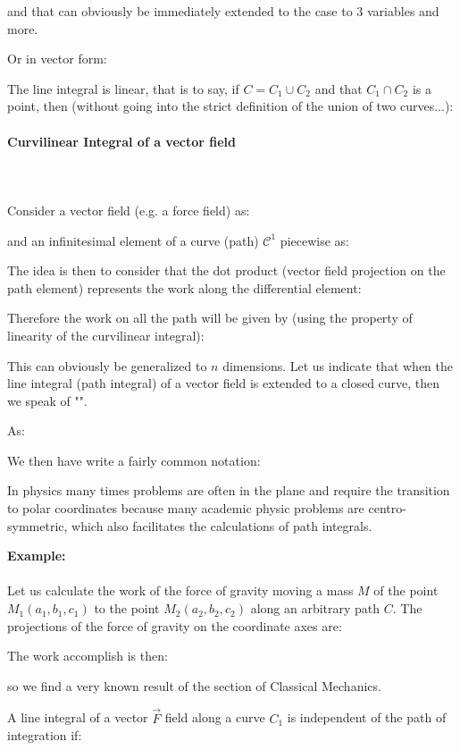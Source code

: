 	and that can obviously be immediately extended to the case to 3 variables and more.
	
	Or in vector form:
	
	The line integral is linear, that is to say, if $C=C_1 \cup C_2$ and that $C_1 \cap C_2$ is a point, then (without going into the strict definition of the union of two curves...):
	
	
	\paragraph{Curvilinear Integral of a vector field}\mbox{}\\\\
	Consider a vector field (e.g. a force field) as:
	
	and an infinitesimal element of a curve (path) $\mathcal{C}^1$ piecewise as:
	
	The idea is then to consider that the dot product (vector field projection on the path element) represents the work along the differential element:
	
	Therefore the work on all the path will be given by (using the property of linearity of the curvilinear integral):
	
	This can obviously be generalized to $n$ dimensions. Let us indicate that when the line integral (path integral) of a vector field is extended to a closed curve, then we speak of "".
	
	As:
	
	We then have write a fairly common notation:
	
	\begin{tcolorbox}[title=Remark,colframe=black,arc=10pt]
	In physics many times problems are often in the plane and require the transition to polar coordinates because many academic physic problems are centro-symmetric, which also facilitates the calculations of path integrals.
	\end{tcolorbox}
	
	\begin{tcolorbox}[colframe=black,colback=white,sharp corners]
	\textbf{{\Large {}}Example:}\\\\
	Let us calculate the work of the force of gravity moving a mass $M$ of the point $M_1(a_1,b_1,c_1)$ to the point $M_2(a_2,b_2,c_2)$ along an arbitrary path $C$. The projections of the force of gravity on the coordinate axes are:
	
	The work accomplish is then:
	
	so we find a very known result of the section of Classical Mechanics.
	\end{tcolorbox}
	A line integral of a vector $\vec{F}$ field along a curve $C_1$ is independent of the path of integration if:
	
